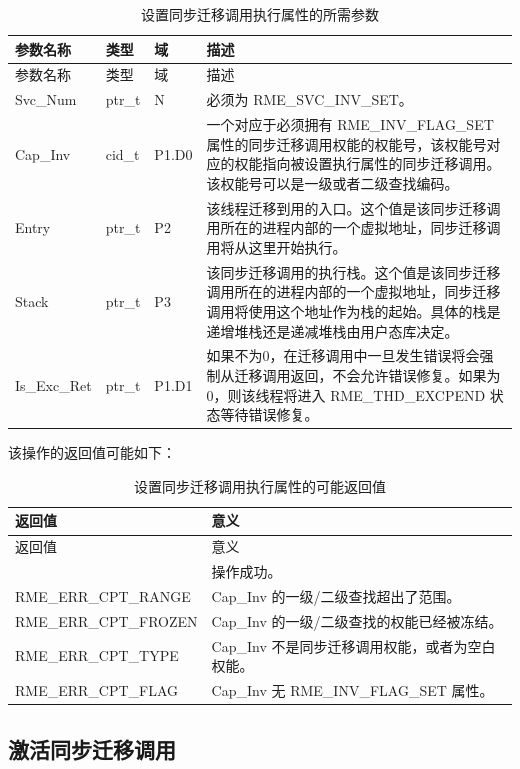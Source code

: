 \begin{xltabular}{\textwidth}{@{}>{\hsize\raggedright\arraybackslash}X>{\hsize\raggedright\arraybackslash}X>{\hsize\raggedright\arraybackslash}X>{\hsize\raggedright\arraybackslash}X@{}}
\caption{设置同步迁移调用执行属性的所需参数}\label{tab:5-8-set-sync-invocation-properties-parameters}\\
\toprule
参数名称 & 类型 & 域 & 描述\tabularnewline
\endfirsthead
\toprule
参数名称 & 类型 & 域 & 描述\tabularnewline
\midrule
\endhead
Svc\_Num & ptr\_t & N & 必须为 RME\_SVC\_INV\_SET。\tabularnewline
Cap\_Inv & cid\_t & P1.D0 &
一个对应于必须拥有 RME\_INV\_FLAG\_SET 属性的同步迁移调用权能的权能号，该权能号对应的权能指向被设置执行属性的同步迁移调用。该权能号可以是一级或者二级查找编码。\tabularnewline
Entry & ptr\_t & P2 &
该线程迁移到用的入口。这个值是该同步迁移调用所在的进程内部的一个虚拟地址，同步迁移调用将从这里开始执行。\tabularnewline
Stack & ptr\_t & P3 &
该同步迁移调用的执行栈。这个值是该同步迁移调用所在的进程内部的一个虚拟地址，同步迁移调用将使用这个地址作为栈的起始。具体的栈是递增堆栈还是递减堆栈由用户态库决定。\tabularnewline
Is\_Exc\_Ret & ptr\_t & P1.D1 &
如果不为0，在迁移调用中一旦发生错误将会强制从迁移调用返回，不会允许错误修复。如果为0，则该线程将进入 RME\_THD\_EXCPEND 状态等待错误修复。\tabularnewline
\end{xltabular}

该操作的返回值可能如下：

\begin{xltabular}{\textwidth}{@{}>{\hsize\raggedright\arraybackslash}X>{\hsize\raggedright\arraybackslash}X@{}}
\caption{设置同步迁移调用执行属性的可能返回值}\label{tab:5-9-set-sync-invocation-properties-return-values}\\
\toprule
返回值 & 意义\tabularnewline
\endfirsthead
\toprule
返回值 & 意义\tabularnewline
\midrule
\endhead
\bottomrule
{} & 操作成功。\tabularnewline
    RME\_ERR\_CPT\_RANGE & Cap\_Inv 的一级/二级查找超出了范围。\tabularnewline
    RME\_ERR\_CPT\_FROZEN & Cap\_Inv 的一级/二级查找的权能已经被冻结。\tabularnewline
    RME\_ERR\_CPT\_TYPE & Cap\_Inv 不是同步迁移调用权能，或者为空白权能。\tabularnewline
    RME\_ERR\_CPT\_FLAG & Cap\_Inv 无 RME\_INV\_FLAG\_SET 属性。\tabularnewline
\end{xltabular}

\subsection{激活同步迁移调用}\label{subsec:5-activate-sync-invocation}

